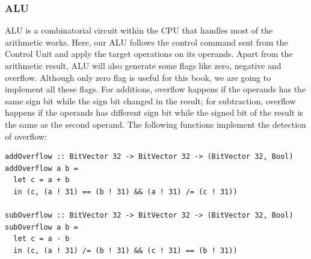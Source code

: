 \documentclass[a4paper,12pt, oneside]{book}
\begin{document}
\subsubsection{ALU}
ALU is a combinatorial circuit within the CPU that handles most of the arithmetic works. Here, our ALU follows the control command sent from the Control Unit and apply the target operations on its operands. Apart from the arithmetic result, ALU will also generate some flags like zero, negative and overflow. Although only zero flag is useful for this book, we are going to implement all these flags. For additions, overflow happens if the operands has the same sign bit while the sign bit changed in the result; for subtraction, overflow happens if the operands has different sign bit while the signed bit of the result is the same as the second operand. The following functions implement the detection of overflow:
\begin{verbatim}
addOverflow :: BitVector 32 -> BitVector 32 -> (BitVector 32, Bool)
addOverflow a b =
  let c = a + b
  in (c, (a ! 31) == (b ! 31) && (a ! 31) /= (c ! 31))

subOverflow :: BitVector 32 -> BitVector 32 -> (BitVector 32, Bool)
subOverflow a b =
  let c = a - b
  in (c, (a ! 31) /= (b ! 31) && (c ! 31) == (b ! 31))
\end{verbatim}
\end{document}
